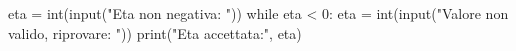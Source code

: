 \begin{unipdcode}[language=Python]
eta = int(input("Eta non negativa: "))
while eta < 0:
    eta = int(input("Valore non valido, riprovare: "))
print("Eta accettata:", eta)
\end{unipdcode}
